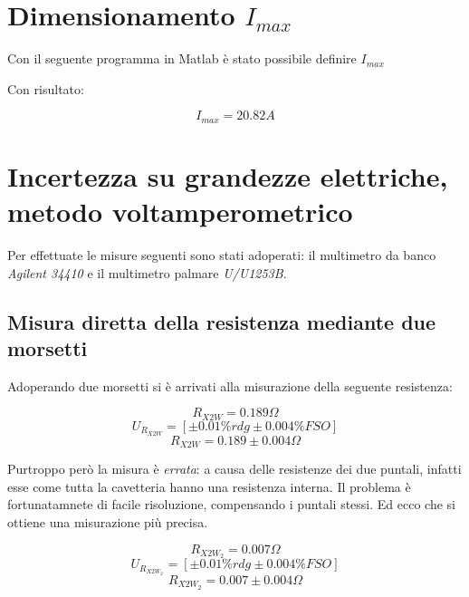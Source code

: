 \documentclass[a4paper]{article}
\begin{document}
\section{Dimensionamento $I_{max}$}
Con il seguente programma in Matlab è stato possibile definire $I_{max}$



Con risultato: 
\begin{Large}
	\begin{equation}
		I_{max} = 20.82 A
	 \end{equation}
\end{Large}


\section {Incertezza su grandezze elettriche, metodo voltamperometrico}
Per effettuate le misure seguenti sono stati adoperati: il multimetro da banco \emph{Agilent 34410} e il multimetro palmare \emph{U/U1253B}.
\subsection{Misura diretta della resistenza mediante due morsetti}
Adoperando due morsetti si è arrivati alla misurazione della seguente resistenza:
\begin{Large}
	\begin{equation}
		R_{X2W}= 0.189 \Omega
	\end{equation}
	\begin{equation}
		U_{R_{X2W}} = [\pm 0.01\%rdg \pm 0.004\% FSO]
	 \end{equation}
	 \begin{equation}
		R_{X2W} = 0.189 \pm 0.004 \Omega
	 \end{equation}
\end{Large}
Purtroppo però la misura è \emph{errata}: a causa delle resistenze dei due puntali, infatti esse come tutta la cavetteria hanno una resistenza interna.
Il problema è fortunatamnete di facile risoluzione, compensando i puntali stessi. Ed ecco che si ottiene una misurazione più precisa.

\begin{Large}
	\begin{equation}
		R_{X2W_{2}} = 0.007 \Omega
	 \end{equation}
	\begin{equation}
		U_{R_{X2W_{2}}} = [\pm 0.01\%rdg \pm 0.004\% FSO]
	 \end{equation}
	 \begin{equation}
		R_{X2W_{2}} = 0.007 \pm 0.004 \Omega
	 \end{equation}
\end{Large}
\end{document}
